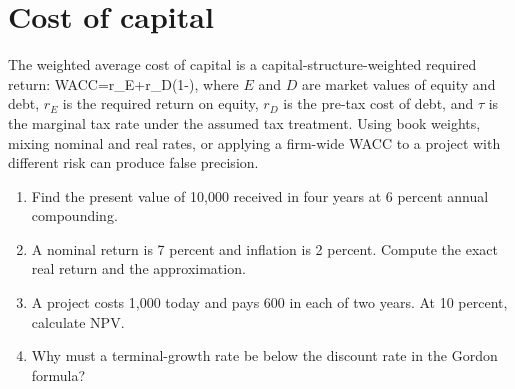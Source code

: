 \section{Cost of capital}
The weighted average cost of capital is a capital-structure-weighted required return:
  WACC=r_E+r_D(1-\tau),
\closeformula
where $E$ and $D$ are market values of equity and debt, $r_E$ is the required return on equity, $r_D$ is the pre-tax cost of debt, and $\tau$ is the marginal tax rate under the assumed tax treatment. Using book weights, mixing nominal and real rates, or applying a firm-wide WACC to a project with different risk can produce false precision.

\begin{exerciseblock}
\begin{enumerate}
  \item Find the present value of 10,000 received in four years at 6 percent annual compounding.
  \item A nominal return is 7 percent and inflation is 2 percent. Compute the exact real return and the approximation.
  \item A project costs 1,000 today and pays 600 in each of two years. At 10 percent, calculate NPV.
  \item Why must a terminal-growth rate be below the discount rate in the Gordon formula?
\end{enumerate}
\end{exerciseblock}
